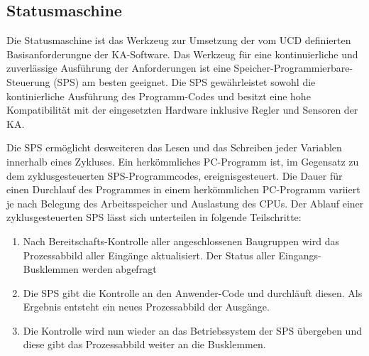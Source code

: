 \subsection{Statusmaschine}
\label{subsec:Statusmaschine}

Die Statusmaschine ist das Werkzeug zur Umsetzung der vom UCD definierten Basisanforderungne der KA-Software. Das Werkzeug für eine kontinuierliche und zuverlässige Ausführung der Anforderungen ist eine Speicher-Programmierbare-Steuerung (SPS) am besten geeignet. Die SPS gewährleistet sowohl die kontinierliche Ausführung des Programm-Codes und besitzt eine hohe Kompatibilität mit der eingesetzten Hardware inklusive Regler und Sensoren der KA. 

Die SPS ermöglicht desweiteren das Lesen und das Schreiben jeder Variablen innerhalb eines Zykluses. Ein herkömmliches PC-Programm ist, im Gegensatz zu dem  zyklusgesteuerten SPS-Programmcodes, ereignisgesteuert. Die Dauer für einen Durchlauf des Programmes in einem herkömmlichen PC-Programm variiert je nach Belegung des Arbeitsspeicher und Auslastung des CPUs. Der Ablauf einer zyklusgesteuerten SPS lässt sich unterteilen in folgende Teilschritte:

\begin{enumerate}
\item	Nach Bereitschafts-Kontrolle aller angeschlossenen Baugruppen wird das Prozessabbild aller Eingänge aktualisiert. Der Status aller Eingangs-Busklemmen werden abgefragt
\item 	Die SPS gibt die Kontrolle an den Anwender-Code und durchläuft diesen. Als Ergebnis entsteht ein neues Prozessabbild der Ausgänge. 
\item	Die Kontrolle wird nun wieder an das Betriebssystem der SPS übergeben und diese gibt das Prozessabbild weiter an die Busklemmen. 
\end{enumerate}


